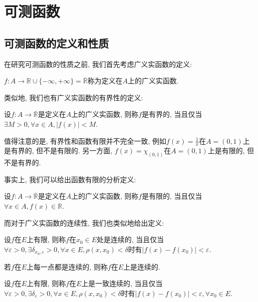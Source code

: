 \documentclass[theorem=false,mathfont=none,openany,sub3section]{easybook}
\newcommand{\btocgroup}[1][toc]{\addtocontents{#1}{\string\begingroup}}
\newcommand{\etocgroup}[1][toc]{\addtocontents{#1}{\string\endgroup}}
\begin{document}
\btocgroup
{}
\chapter{可测函数}
\etocgroup

\section{可测函数的定义和性质}

在研究可测函数的性质之前, 我们首先考虑广义实函数的定义:\par

\begin{definition}
  $f:A\rightarrow \mathbb{R}\cup\{-\infty,+\infty\}=\overline{\mathbb{R} }$称为定义在$A$上的广义实函数.\par
\end{definition}

类似地, 我们也有广义实函数的有界性的定义:\par

\begin{definition}
  设$f:A\rightarrow \overline{\mathbb{R} }$是定义在$A$上的广义实函数, 则称$f$是有界的, 当且仅当$\exists M>0, \forall x\in A, |f(x)|<M$.\par
\end{definition}

\begin{remark}
  值得注意的是, 有界性和函数有限并不完全一致, 例如$f(x)=\frac{1}{x}$在$A=(0,1)$上是有界的, 但不是有限的. 另一方面, $f(x)=\chi_{(0,1)}$在$A=(0,1)$上是有限的, 但不是有界的.\par
\end{remark}

事实上, 我们可以给出函数有限的分析定义:\par

\begin{definition}
  设$f:A\rightarrow \overline{\mathbb{R} }$是定义在$A$上的广义实函数, 则称$f$是有限的, 当且仅当$\forall x\in A, f(x)\in \mathbb{R}$.\par
\end{definition}

而对于广义实函数的连续性, 我们也类似地给出定义:\par

\begin{definition}
  设$f$在$E$上有限, 则称$f$在$x_0\in E$处是连续的, 当且仅当$ \forall \varepsilon >0, \exists \delta_{x_0,\varepsilon} >0, \forall x\in E, \rho(x,x_0)<\delta$时有$ |f(x)-f(x_0)|<\varepsilon$.\par
  若$f$在$E$上每一点都是连续的, 则称$f$在$E$上是连续的.\par
  设$f$在$E$上有限, 则称$f$在$E$上是一致连续的, 当且仅当$ \forall \varepsilon >0, \exists \delta_{\varepsilon} >0, \forall x\in E, \rho(x,x_0)<\delta$时有$ |f(x)-f(x_0)|<\varepsilon, \forall x_0 \in E$.\par
\end{definition}
\end{document}
